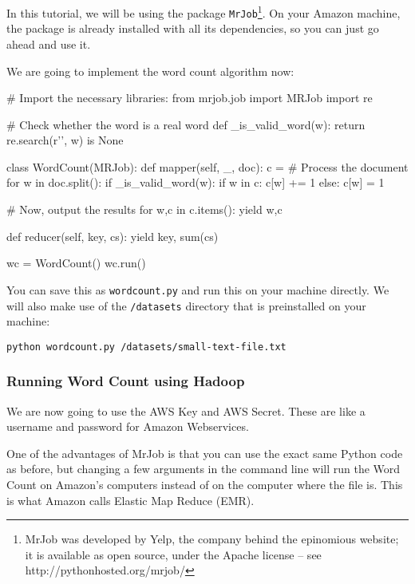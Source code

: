 In this tutorial, we will be using the package \texttt{MrJob}\footnote{MrJob was developed by Yelp, the company behind the epinomious website; it is available
as open source, under the Apache license -- see http://pythonhosted.org/mrjob/}. On your Amazon machine, the package
is already installed with all its dependencies, so you can just go ahead and
use it.

We are going to implement the word count algorithm now:

\begin{python}
# Import the necessary libraries:
from mrjob.job import MRJob
import re

# Check whether the word is a real word
def _is_valid_word(w):
    return re.search(r'\W', w) is None

class WordCount(MRJob):
    def mapper(self, _, doc):
        c = {}
        # Process the document
        for w in doc.split():
            if _is_valid_word(w):
                if w in c:
                    c[w] += 1
                else:
                    c[w] = 1

        # Now, output the results
        for w,c in c.items():
            yield w,c

    def reducer(self, key, cs):
        yield key, sum(cs)

wc = WordCount()
wc.run()
\end{python}

You can save this as \texttt{wordcount.py} and run this on your machine
directly. We will also make use of the \texttt{/datasets} directory that is
preinstalled on your machine:

\begin{verbatim}
python wordcount.py /datasets/small-text-file.txt
\end{verbatim}

\subsubsection{Running Word Count using Hadoop}

We are now going to use the AWS Key and AWS Secret. These are like a username
and password for Amazon Webservices.

One of the advantages of MrJob is that you can use the exact same Python code as before, but changing a few arguments in the command line will run the Word Count on Amazon's computers instead of on the computer where the file is. This is what Amazon calls Elastic Map Reduce (EMR).

